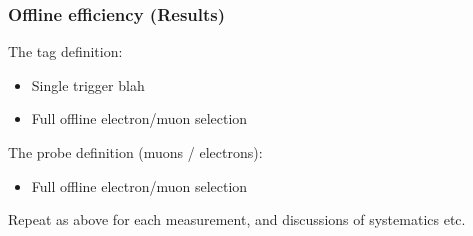 


\subsubsection{Offline efficiency (Results)}

The tag definition:
\begin{itemize}
	\item  Single trigger blah
	\item Full offline electron/muon selection
\end{itemize}
	
The probe definition (muons / electrons):
\begin{itemize}
	\item  Full offline electron/muon selection
\end{itemize}

Repeat as above for each measurement, and discussions of systematics etc.


